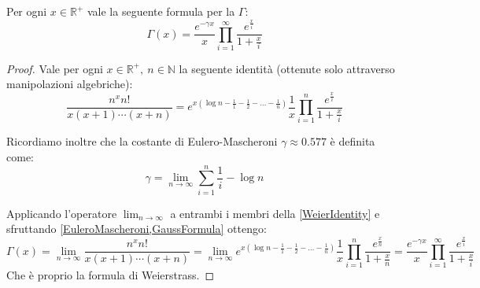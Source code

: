 \begin{corollary}\label{WeierstrassFormula}
	Per ogni $x\in\mathbb{R^+}$ vale la seguente formula per la $\Gamma$:
\begin{equation*}
	\Gamma(x)=\frac{e^{-\gamma x}}x\prod_{i=1}^{\infty} \frac{e^{\frac xi}}{1+\frac xi}
\end{equation*}
\end{corollary}
\begin{proof}
	Vale per ogni $x\in\mathbb{R^+},\ n\in\mathbb{N}$ la seguente identità (ottenute solo attraverso manipolazioni algebriche):
	\begin{equation}\label{WeierIdentity}
		\frac{n^xn!}{x(x+1)\cdots (x+n)}=e^{x\left(\log{n}-\frac11-\frac12-\dots-\frac1n\right)}\frac1x\prod_{i=1}^n\frac{e^{\frac xi}}{1+\frac xi}
	\end{equation}
	
	Ricordiamo inoltre che la costante di Eulero-Mascheroni $\gamma\approx0.577$ è definita come:
	\begin{equation}\label{EuleroMascheroni}
		\gamma=\lim_{n\to\infty} \sum_{i=1}^n \frac1i -\log{n}
	\end{equation}
	
	Applicando l'operatore $\lim_{n\to\infty}$ a entrambi i membri della \cref{WeierIdentity} e sfruttando \cref{EuleroMascheroni,GaussFormula} ottengo:
	\begin{equation*}
		\Gamma(x)=\lim_{n\to \infty} \frac{n^xn!}{x(x+1)\cdots(x+n)}
		=\lim_{n\to\infty} e^{x\left(\log{n}-\frac11-\frac12-\dots-\frac1n\right)}\frac1x\prod_{i=1}^n\frac{e^{\frac xn}}{1+\frac xn}
		=\frac{e^{-\gamma x}}x\prod_{i=1}^{\infty} \frac{e^{\frac xi}}{1+\frac xi}
	\end{equation*}
	Che è proprio la formula di Weierstrass.
\end{proof}






